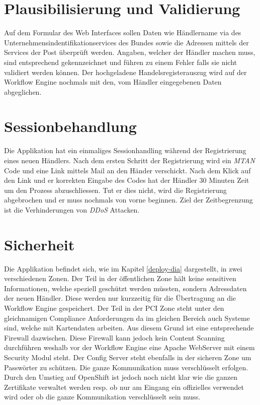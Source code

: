 \section{Plausibilisierung und Validierung}

Auf dem Formular des Web Interfaces sollen Daten wie Händlername via des Unternehmensindentifikationservices des Bundes sowie die Adressen mittels der Services der Post überprüft werden. Angaben, welcher der Händler machen muss, sind entsprechend gekennzeichnet und führen zu einem Fehler falls sie nicht validiert werden können. Der hochgeladene Handelsregisterauszug wird auf der Workflow Engine nochmals mit den, vom Händler eingegebenen Daten abgeglichen.

\section{Sessionbehandlung}

Die Applikation hat ein einmaliges Sessionhandling während der Registrierung eines neuen Händlers. Nach dem ersten Schritt der Registrierung wird ein \textit{\gls{MTAN}} Code und eine Link mittels Mail an den Händer verschickt. Nach dem Klick auf den Link und er korrekten Eingabe des Codes hat der Händler 30 Minuten Zeit um den Prozess abzuschliessen.
Tut er dies nicht, wird die Registrierung abgebrochen und er muss nochmals von vorne beginnen. Ziel der Zeitbegrenzung ist die Verhinderungen von \textit{\gls{DDoS}} Attacken.

\section{Sicherheit}

Die Applikation befindet sich, wie im Kapitel \ref{deploy-dia} dargestellt, in zwei verschiedenen Zonen. Der Teil in der öffentlichen Zone hält keine sensitiven Informationen, welche speziell geschützt werden müssten, sondern Adressdaten der neuen Händler. Diese werden nur kurzzeitig für die Übertragung an die Workflow Engine gespeichert. Der Teil in der PCI Zone steht unter den gleichnamigen Compliance Anforderungen da im gleichen Bereich auch Systeme sind, welche mit Kartendaten arbeiten. Aus diesem Grund ist eine entsprechende Firewall dazwischen. Diese Firewall kann jedoch kein Content Scanning durchführen weshalb vor der Workflow Engine eine Apache WebServer mit einem Security Modul steht. Der Config Server steht ebenfalls in der sicheren Zone um Passwörter zu schützen. Die ganze Kommunikation muss verschlüsselt erfolgen. Durch den Umstieg auf OpenShift ist jedoch noch nicht klar wie die ganzen Zertifikate verwaltet werden resp. ob nur am Eingang ein offizielles verwendet wird oder ob die ganze Kommunikation verschlüsselt sein muss.

